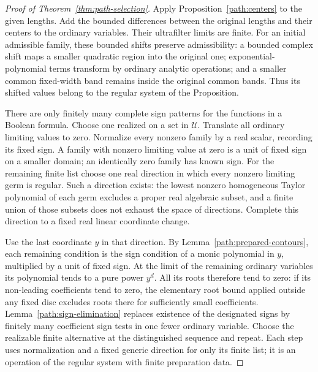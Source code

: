 \begin{proof}[Proof of Theorem~\ref{thm:path-selection}]
Apply Proposition~\ref{path:centers} to the given lengths.  Add the
bounded differences between the original lengths and their centers
to the ordinary variables.  Their ultrafilter limits are finite.
For an initial admissible family, these bounded shifts preserve
admissibility: a bounded complex shift maps a smaller quadratic
region into the original one; exponential-polynomial terms transform
by ordinary analytic operations; and a smaller common fixed-width
band remains inside the original common bands.  Thus its shifted
values belong to the regular system of the Proposition.

There are only finitely many complete sign patterns for the functions
in a Boolean formula.  Choose one realized on a set in \(\mathcal U\).
Translate all ordinary limiting values to zero.  Normalize every
nonzero family by a real scalar, recording its fixed sign.  A family
with nonzero limiting value at zero is a unit of fixed sign on a
smaller domain; an identically zero family has known sign.  For the
remaining finite list choose one real direction in which every
nonzero limiting germ is regular.  Such a direction exists: the
lowest nonzero homogeneous Taylor polynomial of each germ excludes
a proper real algebraic subset, and a finite union of those subsets
does not exhaust the space of directions.  Complete this direction
to a fixed real linear coordinate change.

Use the last coordinate \(y\) in that direction.  By
Lemma~\ref{path:prepared-contours}, each remaining condition is the
sign condition of a monic polynomial in \(y\), multiplied by a unit
of fixed sign.  At the limit of the remaining ordinary variables its
polynomial tends to a pure power \(y^d\).  All its roots therefore
tend to zero: if its non-leading coefficients tend to zero, the
elementary root bound applied outside any fixed disc excludes roots
there for sufficiently small coefficients.  Lemma~\ref{path:sign-elimination}
replaces existence of the designated signs by finitely many coefficient
sign tests in one fewer ordinary variable.  Choose the realizable
finite alternative at the distinguished sequence and repeat.  Each
step uses normalization and a fixed generic direction for only its
finite list; it is an operation of the regular system with finite
preparation data.


\end{proof}
